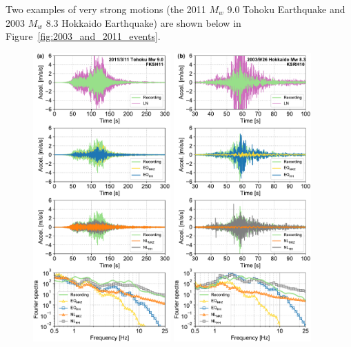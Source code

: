 \documentclass[11pt,letterpaper]{article}
\begin{document}
Two examples of very strong motions (the 2011 $M_w$ 9.0 Tohoku Earthquake and 2003 $M_w$ 8.3 Hokkaido Earthquake) are shown below in Figure~\ref{fig:2003_and_2011_events}.

\begin{figure}[H]
    \noindent \begin{centering}
        \includegraphics[width=0.47\textwidth]{Figure_15a_Tohoku_mainshock_FKSH11__a415}%
        \includegraphics[width=0.47\textwidth]{Figure_15b_Hokkaido_mainshock_KSRH10__a415}
        \par\end{centering}
    

\end{figure}
\end{document}
